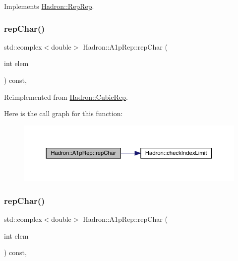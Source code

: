 Implements \mbox{\hyperlink{structHadron_1_1RepRep_ab3213025f6de249f7095892109575fde}{Hadron\+::\+Rep\+Rep}}.

\mbox{\label{structHadron_1_1A1pRep_a9f59a2c62dd82462ab66f5a990939898}} 
\subsubsection{\texorpdfstring{repChar()}{repChar()}\hspace{0.1cm}{\footnotesize\ttfamily [1/2]}}
{\footnotesize\ttfamily std\+::complex$<$double$>$ Hadron\+::\+A1p\+Rep\+::rep\+Char (\begin{DoxyParamCaption}\item[{int}]{elem }\end{DoxyParamCaption}) const\hspace{0.3cm}{\ttfamily [inline]}, {\ttfamily [virtual]}}



Reimplemented from \mbox{\hyperlink{structHadron_1_1CubicRep_af45227106e8e715e84b0af69cd3b36f8}{Hadron\+::\+Cubic\+Rep}}.

Here is the call graph for this function\+:
\nopagebreak
\begin{figure}[H]
\begin{center}
\leavevmode
\includegraphics[width=350pt]{da/dc7/structHadron_1_1A1pRep_a9f59a2c62dd82462ab66f5a990939898_cgraph}
\end{center}
\end{figure}
\mbox{\label{structHadron_1_1A1pRep_a9f59a2c62dd82462ab66f5a990939898}} 
\subsubsection{\texorpdfstring{repChar()}{repChar()}\hspace{0.1cm}{\footnotesize\ttfamily [2/2]}}
{\footnotesize\ttfamily std\+::complex$<$double$>$ Hadron\+::\+A1p\+Rep\+::rep\+Char (\begin{DoxyParamCaption}\item[{int}]{elem }\end{DoxyParamCaption}) const\hspace{0.3cm}{\ttfamily [inline]}, {\ttfamily [virtual]}}



